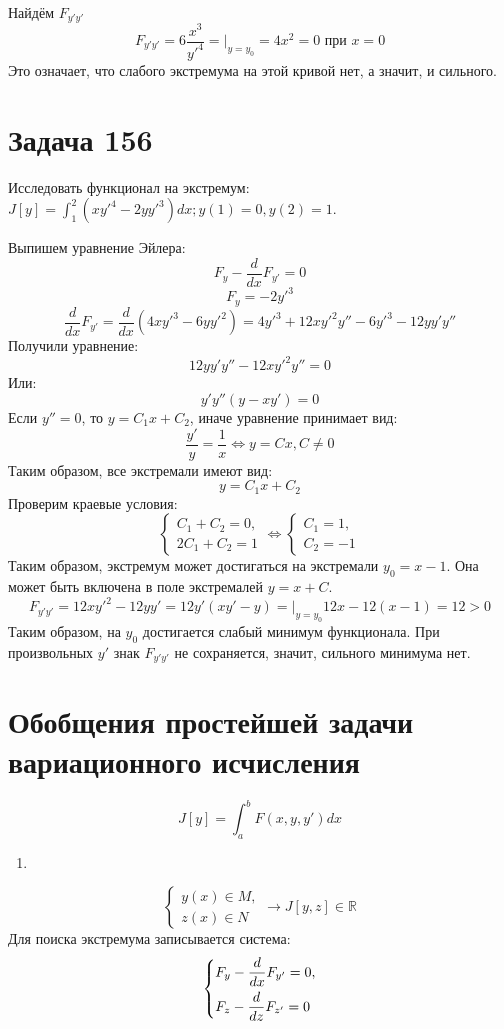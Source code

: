 \documentclass[11pt]{article}
\begin{document}
Найдём \(F_{y'y'}\)
$$F_{y'y'} = 6\frac{x^3}{y'^4} =|_{y = y_0} = 4x^2 = 0 \text{ при } x = 0$$
Это означает, что слабого экстремума на этой кривой нет, а значит, и сильного.
\section{Задача 156}
\label{sec:org8ab6f96}
Исследовать функционал на экстремум: \(J[y] = \int_1^2(xy'^4 - 2yy'^3)dx; y(1) = 0, y(2) = 1\).

Выпишем уравнение Эйлера:
$$F_y - \frac{d}{dx}F_{y'} = 0$$
$$F_y = -2y'^3$$
$$\frac{d}{dx}F_{y'} = \frac{d}{dx}(4xy'^3 - 6yy'^2) = 4y'^3 + 12xy'^2y'' - 6y'^3 - 12yy'y''$$
Получили уравнение:
$$12yy'y'' - 12xy'^2y'' = 0$$
Или:
$$y'y''(y - xy') = 0$$
Если \(y'' = 0\), то \(y = C_1x + C_2\), иначе уравнение принимает вид:
$$\frac{y'}y = \frac{1}x \Leftrightarrow y = Cx, C \neq 0$$
Таким образом, все экстремали имеют вид:
$$y = C_1x + C_2$$
Проверим краевые условия:
\begin{equation*}
\begin{cases}
C_1 + C_2 = 0, \\
2C_1 + C_2 = 1
\end{cases}
\Leftrightarrow
\begin{cases}
C_1 = 1, \\
C_2 = -1
\end{cases}
\end{equation*}
Таким образом, экстремум может достигаться на экстремали \(y_0 = x - 1\). Она может быть включена в поле экстремалей
\(y = x + C\).
$$F_{y'y'} = 12xy'^2 - 12yy' = 12y'(xy' - y) = |_{y = y_0} 12x - 12(x - 1) = 12 > 0$$
Таким образом, на \(y_0\) достигается слабый минимум функционала. При произвольных \(y'\) знак \(F_{y'y'}\) не сохраняется,
значит, сильного минимума нет.
\section{Обобщения простейшей задачи вариационного исчисления}
\label{sec:org2c63ca9}
$$J[y] = \int_a^bF(x, y, y')dx$$
\begin{enumerate}
\item 
\end{enumerate}
\begin{equation*}
\begin{cases}
y(x) \in M, \\
z(x) \in N
\end{cases}
\rightarrow J[y, z] \in \mathbb{R}
\end{equation*}
Для поиска экстремума записывается система:
\begin{equation*}
\begin{dcases}
F_y - \frac{d}{dx}F_{y'} = 0, \\
F_z - \frac{d}{dz}F_{z'} = 0
\end{dcases}
\end{equation*}
\end{document}
